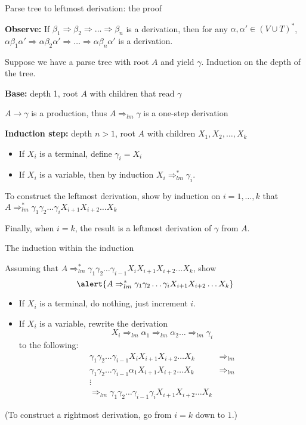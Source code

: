 \documentclass[handout]{beamer}
\begin{document}
\begin{frame}{Parse tree to leftmost derivation: the proof}

	\textbf{Observe:} If $\beta_1\Rightarrow\beta_2\Rightarrow\dots\Rightarrow\beta_n$ is a derivation, then for any $\alpha,\alpha'\in (V\cup T)^*$, $\alpha\beta_1\alpha'\Rightarrow\alpha\beta_2\alpha'\Rightarrow\dots\Rightarrow\alpha\beta_n\alpha'$ is a derivation.

	Suppose we have a parse tree with root $A$ and yield $\gamma$. Induction on the depth of the tree.

	\textbf{Base:} depth 1, root $A$ with children that read $\gamma$ 
	
	$A\rightarrow\gamma$ is a production, thus $A\Rightarrow_{lm}\gamma$ is a one-step derivation

	\textbf{Induction step:} depth $n>1$, root $A$ with children $X_1,X_2,\dots,X_k$
	
	\begin{itemize}
		\item If $X_i$ is a terminal, define $\gamma_i=X_i$
		\item If $X_i$ is a variable, then by induction $X_i\Rightarrow^*_{lm}\gamma_i$.
	\end{itemize}
	To construct the leftmost derivation, show by induction on $i=1,\dots,k$ that \alert{$A \Rightarrow^*_{lm}\gamma_1\gamma_2\dots \gamma_i X_{i+1}X_{i+2}\dots X_{k}$}

	Finally, when $i=k$, the result is a leftmost derivation of $\gamma$ from $A$.
	
\end{frame}


\begin{frame}{The induction within the induction}

	Assuming that $A \Rightarrow^*_{lm}\gamma_1\gamma_2\dots \gamma_{i-1}X_iX_{i+1}X_{i+2}\dots X_{k}$, show
	$$
	\alert{A \Rightarrow^*_{lm}\gamma_1\gamma_2\dots \gamma_i X_{i+1}X_{i+2}\dots X_{k}}
	$$

	\begin{itemize}
		\item If $X_i$ is a terminal, do nothing, just increment $i$.
		\item If $X_i$ is a variable, rewrite the derivation
		$$
		X_i\Rightarrow_{lm}\alpha_1\Rightarrow_{lm}\alpha_2 \dots \Rightarrow_{lm}\gamma_i
		$$
		to the following:
		\begin{align*}
			\gamma_1\gamma_2\dots \gamma_{i-1}X_iX_{i+1}X_{i+2}\dots X_{k}&\Rightarrow_{lm} \\
			\gamma_1\gamma_2\dots \gamma_{i-1}\alpha_1 X_{i+1}X_{i+2}\dots X_{k}&\Rightarrow_{lm} \\
			\vdots&\\
			\Rightarrow_{lm}\gamma_1\gamma_2\dots \gamma_{i-1}\gamma_iX_{i+1}X_{i+2}\dots X_{k}&
		\end{align*}
	\end{itemize}

	\bigskip

	(To construct a rightmost derivation, go from $i=k$ down to $1$.)

\end{frame}
\end{document}
